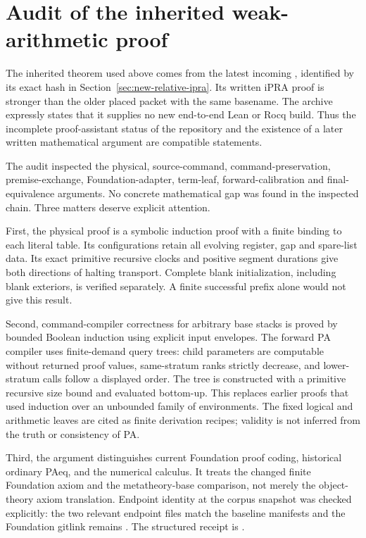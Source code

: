\section{Audit of the inherited weak-arithmetic proof}
\label{sec:inherited-audit}

The inherited theorem used above comes from the latest incoming
, identified by its exact
hash in Section~\ref{sec:new-relative-ipra}.  Its written iPRA
proof is stronger than the older placed packet with the same basename.
The archive expressly states that it supplies no new end-to-end Lean
or Rocq build.  Thus the incomplete proof-assistant status of the
repository and the existence of a later written mathematical argument
are compatible statements.

The audit inspected the physical, source-command, command-preservation,
premise-exchange, Foundation-adapter, term-leaf, forward-calibration and
final-equivalence arguments.  No concrete mathematical gap was found in
the inspected chain.  Three matters deserve explicit attention.

First, the physical proof is a symbolic induction proof with a finite
binding to each literal table.  Its configurations retain all evolving
register, gap and spare-list data.  Its exact primitive recursive clocks
and positive segment durations give both directions of halting
transport.  Complete blank initialization, including blank exteriors,
is verified separately.  A finite successful prefix alone would not
give this result.

Second, command-compiler correctness for arbitrary base stacks is proved
by bounded Boolean induction using explicit input envelopes.  The
forward PA compiler uses finite-demand query trees: child parameters
are computable without returned proof values, same-stratum ranks
strictly decrease, and lower-stratum calls follow a displayed order.
The tree is constructed with a primitive recursive size bound and
evaluated bottom-up.  This replaces earlier proofs that used induction
over an unbounded family of environments.  The fixed logical and
arithmetic leaves are cited as finite derivation recipes; validity is
not inferred from the truth or consistency of PA.

Third, the argument distinguishes current Foundation proof coding,
historical ordinary PAeq, and the numerical calculus.  It treats the
changed finite Foundation axiom and the metatheory-base comparison,
not merely the object-theory axiom translation.  Endpoint identity at
the corpus snapshot was checked explicitly: the two relevant endpoint
files match the baseline manifests and the Foundation gitlink remains
.  The structured
receipt is .

